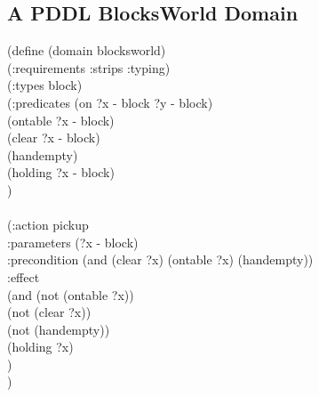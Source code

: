 \begin{appendix}
\chapter{A PDDL BlocksWorld Domain}
\label{pddlDomain}
\hspace*{1cm}(define (domain blocksworld)
\\ \hspace*{1.5cm}    (:requirements :strips :typing)
\\ \hspace*{1.5cm}    (:types block)
\\ \hspace*{1.5cm}    (:predicates (on ?x - block ?y - block)
\\ \hspace*{2cm}	       (ontable ?x - block)
\\ \hspace*{2cm}	       (clear ?x - block)
\\ \hspace*{2cm}	       (handempty)
\\ \hspace*{2cm}	       (holding ?x - block)
\\ \hspace*{1.5cm}    )
\\ \hspace*{1.5cm}
\\ \hspace*{1.5cm}(:action pickup
\\ \hspace*{2cm}	     :parameters (?x - block)
\\ \hspace*{2cm}	     :precondition (and (clear ?x) (ontable ?x) (handempty))
\\ \hspace*{2cm}	     :effect
\\ \hspace*{2cm}	     (and (not (ontable ?x))
\\ \hspace*{2.5cm}		   (not (clear ?x))
\\ \hspace*{2.5cm}		   (not (handempty))
\\ \hspace*{2.5cm}		   (holding ?x)
\\ \hspace*{2cm})
\\ \hspace*{1.5cm})

\end{appendix}
